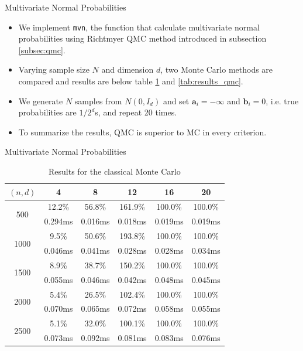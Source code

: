 \begin{frame}{Multivariate Normal Probabilities} 

	\begin{itemize}
		\item We implement \texttt{mvn}, the function that calculate multivariate normal probabilities using Richtmyer QMC method introduced in subsection \ref{subsec:qmc}. 
		\item Varying sample size $N$ and dimension $d$, two Monte Carlo methods are compared and results are below table \ref{tab:results_mc} and \ref{tab:results_qmc}. 
		\item We generate $N$ samples from $N(0, I_d)$ and set $\mathbf{a}_i = -\infty$ and $\mathbf{b}_i = 0$, i.e. true probabilities are $1/2^d$s, and repeat 20 times. 
		\item To summarize the results, QMC is superior to MC in every criterion. 
	\end{itemize}

\end{frame}
	
\begin{frame}{Multivariate Normal Probabilities} 
	
	\begin{table}[!h]
		\centering
		{
			\begin{tabular}{@{}cccccc@{}}
				\toprule
				$(n, d)$ 				  & 4 		& 8 	  & 12 		& 16 	  & 20	 \\ \midrule
				\multirow{2}{*}{500}  & 12.2\%  & 56.8\%  & 161.9\% & 100.0\% & 100.0\% \\
									  & 0.294ms & 0.016ms & 0.018ms & 0.019ms & 0.019ms \\
				\multirow{2}{*}{1000} & 9.5\%   & 50.6\%  & 193.8\% & 100.0\% & 100.0\% \\
									  & 0.046ms & 0.041ms & 0.028ms & 0.028ms & 0.034ms \\
				\multirow{2}{*}{1500} & 8.9\%   & 38.7\%  & 150.2\% & 100.0\% & 100.0\% \\
									  & 0.055ms & 0.046ms & 0.042ms & 0.048ms & 0.045ms \\
				\multirow{2}{*}{2000} & 5.4\%   & 26.5\%  & 102.4\% & 100.0\% & 100.0\% \\
									  & 0.070ms & 0.065ms & 0.072ms & 0.058ms & 0.055ms \\
				\multirow{2}{*}{2500} & 5.1\%   & 32.0\%  & 100.1\% & 100.0\% & 100.0\% \\
									  & 0.073ms & 0.092ms & 0.081ms & 0.083ms & 0.076ms \\
				\bottomrule
			\end{tabular}%
		}
		\caption{Results for the classical Monte Carlo}
		\label{tab:results_mc}
	\end{table}	

\end{frame}

